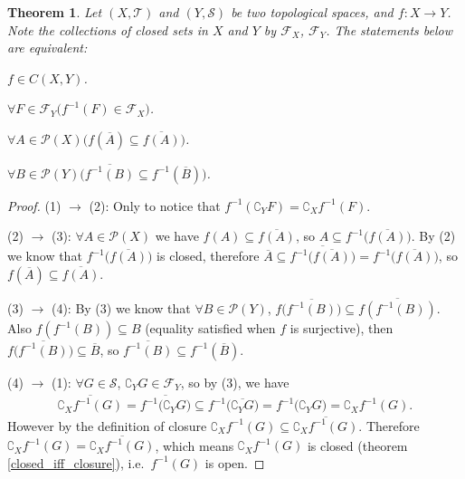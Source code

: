 \documentclass[openany]{book}
\theoremstyle{plain}
\newtheorem{theorem}{Theorem}[section] %
\theoremstyle{definition}
\begin{document}
\begin{theorem}
Let $(X, \mathscr T)$ and $(Y,\mathscr S)$ be two topological spaces, and $f\colon X\to Y$. Note the collections of closed sets in $X$ and $Y$ by $\mathscr F_X$, $\mathscr F_Y$.
The statements below are equivalent:
\begin{conditionlist}[label=(\arabic*)]
\item $f\in C(X,Y)$.
\item $\forall F\in\mathscr F_Y \big(
	f^{-1} (F) \in \mathscr F_X\big)$.
\item $\forall A\in \mathscr P(X) \big(
	f(\overline A) \subseteq \overline{ f(A)}\big)$.
\item $\forall B\in \mathscr P(Y) \big(
	\overline{f^{-1} (B)}\subseteq f^{-1} (\overline B) \big)$.
\end{conditionlist} 
\end{theorem}
\begin{proof}
(1) $\to$ (2): Only to notice that $f^{-1} (\complement_Y F ) =\complement_X f^{-1} (F)$. 

(2) $\to$ (3): $\forall A \in \mathscr P(X)$ we have $f(A) \subseteq \overline{f(A)}$, so $A \subseteq f^{-1} \big(
	\overline{f(A)}\big)$. 
By (2) we know that $f^{-1} \big(\overline{f(A)}\big)$ is closed, therefore 
$\overline A \subseteq \overline{f^{-1} \big(\overline{f(A)}\big)} 
	= f^{-1} \big(\overline{f(A)}\big)$, so $f(\overline A) \subseteq \overline {f(A)}$.
	
(3) $\to$ (4): By (3) we know that $\forall B\in \mathscr P(Y)$, 
$f\big(\overline{f^{-1}(B)}\big) \subseteq \overline{f(f^{-1}(B))}$. 
Also $f(f^{-1}(B)) \subseteq B$ (equality satisfied when $f$ is surjective), 
then $f\big(\overline{f^{-1}(B)}\big) \subseteq \overline B$, 
so $\overline{f^{-1}(B)} \subseteq f^{-1} (\overline B)$.

(4) $\to$ (1): $\forall G\in \mathscr S$, $\complement_Y G \in \mathscr F_Y$, so by (3), we have
\begin{align*}
	\overline {\complement_X f^{-1}(G)} =\overline {f^{-1}\big(\complement_Y G\big)} 
		\subseteq  f^{-1}\big(\overline{\complement_Y G}\big) = f^{-1}\big(\complement_Y G\big)
			=\complement_X f^{-1}(G).
\end{align*}
However by the definition of closure $\complement_X f^{-1}(G) \subseteq \overline {\complement_X f^{-1}(G)}$.
Therefore $\complement_X f^{-1}(G) = \overline {\complement_X f^{-1}(G)}$, which means $\complement_X f^{-1}(G)$ is closed (theorem \ref{closed_iff_closure}), i.e.\ $f^{-1}(G)$ is open. 
\end{proof}
\end{document}
